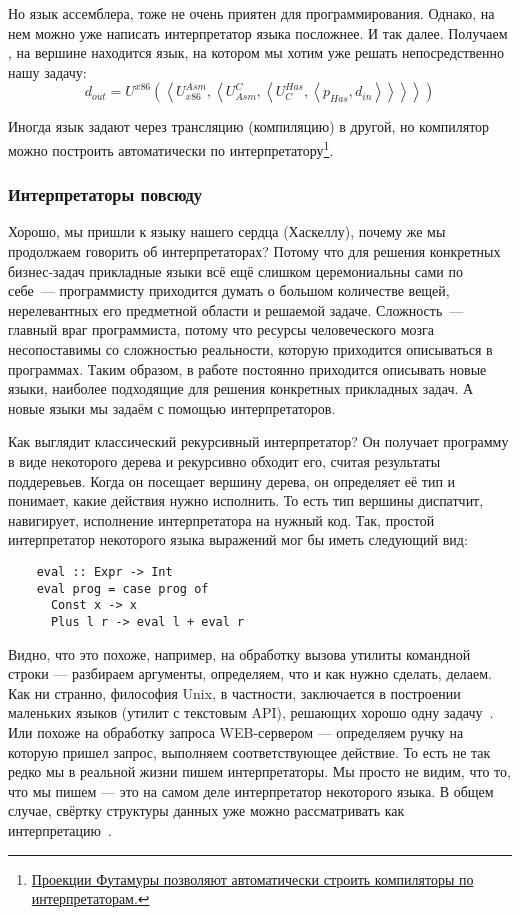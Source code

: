 Но язык ассемблера, тоже не очень приятен для программирования.
Однако, на нем можно уже написать интерпретатор языка посложнее.
И так далее.
Получаем , на вершине находится язык, на котором мы хотим уже решать непосредственно нашу задачу:
\[
    d_{out} =
    U^{x86}\left(\left<
    U_{x86}^{Asm}, \left<
    U^C_{Asm}, \left<
    U^{Has}_C, \left< p_{Has}, d_{in}
    \right>\right>\right>\right>\right)
\]

Иногда язык задают через трансляцию (компиляцию) в другой, но компилятор можно построить автоматически по интерпретатору\footnote{\href{https://habr.com/ru/articles/47418/}{Проекции Футамуры позволяют автоматически строить компиляторы по интерпретаторам.}}.

\subsubsection{Интерпретаторы повсюду}

Хорошо, мы пришли к языку нашего сердца (Хаскеллу), почему же мы продолжаем говорить об интерпретаторах?
Потому что для решения конкретных бизнес-задач прикладные языки всё ещё слишком церемониальны сами по себе~--- программисту приходится думать о большом количестве вещей, нерелевантных его предметной области и решаемой задаче.
Сложность~--- главный враг программиста, потому что ресурсы человеческого мозга несопоставимы со сложностью реальности, которую приходится описываться в программах.
Таким образом, в работе постоянно приходится описывать новые языки, наиболее подходящие для решения конкретных прикладных задач.
А новые языки мы задаём с помощью интерпретаторов.

Как выглядит классический рекурсивный интерпретатор?
Он получает программу в виде некоторого дерева и рекурсивно обходит его, считая результаты поддеревьев.
Когда он посещает вершину дерева, он определяет её тип и понимает, какие действия нужно исполнить.
То есть тип вершины диспатчит, навигирует, исполнение интерпретатора на нужный код.
Так, простой интерпретатор некоторого языка выражений мог бы иметь следующий вид:
\begin{verbatim}
    eval :: Expr -> Int
    eval prog = case prog of
      Const x -> x
      Plus l r -> eval l + eval r
\end{verbatim}

Видно, что это похоже, например, на обработку вызова утилиты командной строки --- разбираем аргументы, определяем, что и как нужно сделать, делаем.
Как ни странно, философия Unix, в частности, заключается в построении маленьких языков (утилит с текстовым API), решающих хорошо одну задачу~\cite{bentley1986little}.
Или похоже на обработку запроса WEB-сервером --- определяем ручку на которую пришел запрос, выполняем соответствующее действие.
То есть не так редко мы в реальной жизни пишем интерпретаторы.
Мы просто не видим, что то, что мы пишем --- это на самом деле интерпретатор некоторого языка.
В общем случае, свёртку структуры данных уже можно рассматривать как интерпретацию~\cite{gibbons2014folding}.


